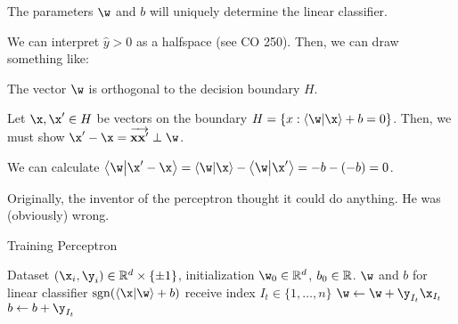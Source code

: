 \documentclass[class=cs480,notes,tikz]{agony}
\begin{document}
The parameters $\w$ and $b$ will uniquely determine the linear classifier.

\begin{example}
  We can interpret $\hat y > 0$ as a halfspace (see CO 250).
  Then, we can draw something like:
  \begin{center}
  \end{center}
\end{example}

\begin{prop}
  The vector $\w$ is orthogonal to the decision boundary $H$.
\end{prop}
\begin{prf}
  Let $\x, \x' \in H$ be vectors on the boundary $H = \{x : \ip{\w}{\x} + b = 0\}$.
  Then, we must show $\x' - \x = \overrightarrow{\vb{xx'}} \perp \w$.

  We can calculate $\ip{\w}{\x' - \x}
    = \ip{\w}{\x} - \ip{\w}{\x'}
    = -b - (-b) = 0$.
\end{prf}

Originally, the inventor of the perceptron thought it could do anything.
He was (obviously) wrong.

\begin{algorithm}[H]
  \caption{Training Perceptron}
  \begin{algorithmic}
    \Require Dataset $(\x_i, \y_i) \in \R^d \times \{\pm 1\}$,
    initialization $\w_0 \in \R^d$, $b_0 \in \mathbb{R}$.
    \Ensure $\w$ and $b$ for linear classifier $\sgn(\ip{\x}{\w} + b)$
    \State receive index $I_t \in \{1,\dotsc,n\}$
    \State $\w \gets \w + \y_{I_t}\x_{I_t}$
    \State $b \gets b + \y_{I_t}$
      \EndIf
      \EndFor
  \end{algorithmic}
\end{algorithm}
\end{document}
